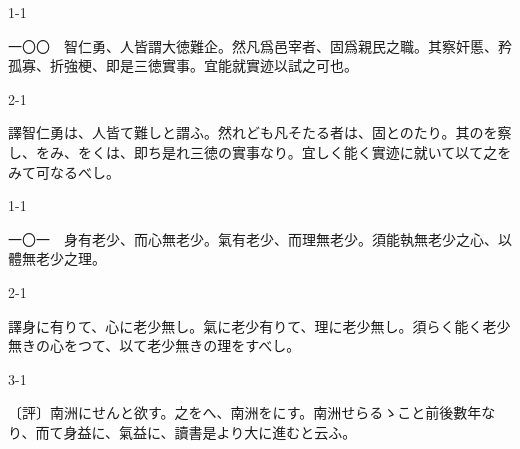 \documentclass[tate,paper=b6j,jafontsize=9pt]{jlreq}
\begin{document}
\begin{azconvIndented}{1\zw}{-1\zw}

一〇〇　智仁勇、人皆謂大徳難\azconvKunten{\azconvIR}企。然凡爲邑宰者、固爲親民之職。其察奸慝、矜孤寡、折強梗、即是三徳實事。宜能就實迹以試之可也。

\end{azconvIndented}
\begin{azconvIndented}{2\zw}{-1\zw}

譯智仁勇は、人皆て難しと謂ふ。然れども凡そたる者は、固とのたり。其のを察し、をみ、をくは、即ち是れ三徳の實事なり。宜しく能く實迹に就いて以て之をみて可なるべし。

\end{azconvIndented}

\begin{azconvIndented}{1\zw}{-1\zw}

一〇一　身有老少、而心無老少。氣有老少、而理無老少。須能執無老少之心、以體無老少之理。

\end{azconvIndented}
\begin{azconvIndented}{2\zw}{-1\zw}

譯身に有りて、心に老少無し。氣に老少有りて、理に老少無し。須らく能く老少無きの心をつて、以て老少無きの理をすべし。

\end{azconvIndented}
\begin{azconvIndented}{3\zw}{-1\zw}

〔評〕南洲にせんと欲す。之をへ、南洲をにす。南洲せらるゝこと前後數年なり、而て身益に、氣益に、讀書是より大に進むと云ふ。

\end{azconvIndented}
\end{document}
